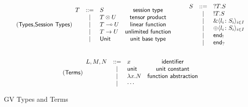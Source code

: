 \begin{figure*}
\begin{gather*}
  \tag{\key{Types},\key{Session Types}}
  \begin{array}{rclc}
    T & \bnf & S & \key{session type}\\
      & \alt & \tensor{T}{U} & \key{tensor product}\\
      & \alt & \lfn{T}{U} & \key{linear function}\\
      & \alt & \fn{T}{U} & \key{unlimited function}\\
      & \alt & \key{Unit} & \key{unit base type}
  \end{array}
  \qquad
  \begin{array}{rcl}
    S & \bnf & \inpt{T}{S}\\
      & \alt & \outpt{T}{S}\\
      & \alt & \Branch{l_i}{S_i}{i\in I}\\
      & \alt & \Choice{l_i}{S_i}{i\in I}\\
      & \alt & \outend\\
      & \alt & \inend
  \end{array}
  \\ \\
  \tag{\key{Terms}}
  \begin{array}{rclc}
    L,M,N & \bnf & x          & \key{identifier}\\
          & \alt & \key{unit} & \key{unit constant}\\
          & \alt & \abs{x}{N} & \key{function abstraction}\\
          & \alt & \cdots     &
  \end{array}
\end{gather*}
\caption{GV Types and Terms}
\label{fig:gvtnts}
\end{figure*}
